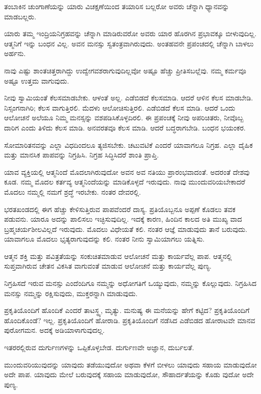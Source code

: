ತಂಬಾಕಿನ ಚುಂಗಾಣೆಯನ್ನು ಯಾರು ವಿಚಕ್ಷಣೆಯಿಂದ ತಯಾರಿಸ ಬಲ್ಲರೋ ಅವರು ಚೆನ್ನಾಗಿ ಧ್ಯಾನವನ್ನು ಮಾಡಬಲ್ಲರು.

ಯಾರು ತಮ್ಮ ಇಂದ್ರಿಯನಿಗ್ರಹವನ್ನು ಚೆನ್ನಾಗಿ ಮಾಡಿರುವರೋ ಅವರು ಯಾರ ಹೊರಗಿನ ಪ್ರಭಾವಕ್ಕೂ ಬೀಳುವುದಿಲ್ಲ. ಆತ್ಮನಿಗೆ ಇನ್ನು ಬಂಧನ ವಿಲ್ಲ. ಅವನ ಮನಸ್ಸು ಸ್ವತಂತ್ರವಾಗಿರುವುದು. ಅಂತಹವನೇ ಪ್ರಪಂಚದಲ್ಲಿ ಚೆನ್ನಾಗಿ ಬಾಳಲು ಅರ್ಹನು.

ನಾವು ಎಷ್ಟು ಶಾಂತಚಿತ್ತರಾಗಿದ್ದು ಉದ್ವೇಗವಶರಾಗುವುದಿಲ್ಲವೋ ಅಷ್ಟೂ ಹೆಚ್ಚು ಪ್ರೀತಿಸಬಲ್ಲೆವು. ನಮ್ಮ ಕರ್ಮವೂ ಅಷ್ಟೂ ಉತ್ತಮ ವಾಗುವುದು.

ನೀವು ಸ್ವಾಮಿಯಂತೆ ಕೆಲಸಮಾಡಬೇಕು. ಆಳಂತೆ ಅಲ್ಲ. ಎಡೆಬಿಡದೆ ಕೆಲಸಮಾಡಿ. ಆದರೆ ಆಳಿನ ಕೆಲಸ ಮಾಡಬೇಡಿ. ನಿಸ್ಸಂಗನಾಗಿರಿ; ಕೆಲಸ ವಾಗುತ್ತಿರಲಿ. ಮೆದಳು ಆಲೋಚಿಸುತ್ತಿರಲಿ. ಎಡೆಬಿಡದೆ ಕೆಲಸ ಮಾಡಿ. ಆದರೆ ಒಂದು ಆಲೋಚನೆ ಅಲೆಯೂ ನಿಮ್ಮ ಮನಸ್ಸನ್ನು ವಶಪಡಿಸಿಕೊಳ್ಳದಿರಲಿ. ಈ ಪ್ರಪಂಚಕ್ಕೆ ನೀವು ಅಪರಿಚಿತರು, ನೀವೊಬ್ಬ ದಾರಿಗ ಎಂದು ತಿಳಿದು ಕೆಲಸ ಮಾಡಿ. ಅನವರತವೂ ಕೆಲಸ ಮಾಡಿ. ಆದರೆ ಬದ್ಧರಾಗಬೇಡಿ. ಬಂಧನ ಭಯಂಕರ.

ಸೋಮಾರಿತನವನ್ನು ಎಲ್ಲಾ ವಿಧದಿಂದಲೂ ತ್ಯಜಿಸಬೇಕು. ಚಟುವಟಿಕೆ ಎಂದರೆ ಯಾವಾಗಲೂ ನಿಗ್ರಹ. ಎಲ್ಲಾ ದೈಹಿಕ ಮತ್ತು ಮಾನಸಿಕ ಪಾಪವನ್ನು ನಿಗ್ರಹಿಸಿ. ನಿಗ್ರಹ ಸಿದ್ಧಿಸಿದರೆ ಶಾಂತಿ ಪ್ರಾಪ್ತಿ.

ಯಾವ ವ್ಯಕ್ತಿಯಲ್ಲಿ ಆತ್ಮನಿಂದೆ ಮೊದಲಾಗಿರುವುದೋ ಅವನ ಅವ ನತಿಯು ಪ್ರಾರಂಭವಾದಂತೆ. ಅದರಂತೆ ದೇಶವು ಕೂಡ. ನಮ್ಮ ಮೊದಲ ಕರ್ತವ್ಯ ಆತ್ಮನಿಂದೆಯನ್ನು ಮಾಡಿಕೊಳ್ಳದೆ ಇರುವುದು. ನಾವು ಮುಂದುವರಿಯಬೇಕಾದರೆ ಮೊದಲು ನಮ್ಮಲ್ಲಿ ನಮಗೆ ಶ್ರದ್ಧೆ ಇರಬೇಕು. ನಂತರ ದೇವರಲ್ಲಿ.

ಭರತಖಂಡದಲ್ಲಿ ಈಗ ಹೆಚ್ಚು ಕೇಳಿಸುತ್ತಿರುವ ಪಾಪವೆಂದರೆ ದಾಸ್ಯ. ಪ್ರತಿಯೊಬ್ಬನೂ ಅಪ್ಪಣೆ ಕೊಡಲು ತವಕ ಪಡುವನು. ಯಾರೂ ಅದನ್ನು ಪಾಲಿಸಲು ಇಚ್ಛಿಸುವುದಿಲ್ಲ. ಇದಕ್ಕೆ ಕಾರಣ, ಹಿಂದಿನ ಕಾಲದ ಅತಿ ಮುಖ್ಯ ವಾದ ಬ್ರಹ್ಮಚರ್ಯಶೀಲವಿಲ್ಲದೆ ಇರುವುದು. ಮೊದಲು ವಿಧೇಯತೆ ಕಲಿ. ನಂತರ ಆಜ್ಞೆ ಮಾಡುವುದು ತಾನೆ ಬರುವುದು. ಯಾವಾಗಲೂ ಮೊದಲು ಭೃತ್ಯರಾಗುವುದನ್ನು ಕಲಿ. ನಂತರ ನೀನು ಸ್ವಾಮಿಯಾಗಲು ಯತ್ನಿಸು.

ಆತ್ಮನ ಶಕ್ತಿ ಮತ್ತು ಪವಿತ್ರತೆಯನ್ನು ಸಂಕುಚಿತಮಾಡುವ ಆಲೋಚನೆ ಮತ್ತು ಕಾರ್ಯವೆಲ್ಲ ಪಾಪ. ಆತ್ಮನಲ್ಲಿ ಸುಪ್ತವಾಗಿರುವ ಚೇತನ ವಿಕಸಿತ ವಾಗುವಂತೆ ಮಾಡುವ ಆಲೋಚನೆ ಮತ್ತು ಕಾರ್ಯವೆಲ್ಲ ಪುಣ್ಯ.

ನಿಗ್ರಹಿಸದೆ ಇರುವ ಮನಸ್ಸು ಎಂದೆಂದಿಗೂ ನಮ್ಮನ್ನು ಅಧೋಗತಿಗೆ ಒಯ್ಯುವುದು, ನಮ್ಮನ್ನು ಕೊಲ್ಲುವುದು. ನಿಗ್ರಹಿಸಿದ ಮನಸ್ಸು ನಮ್ಮನ್ನು ರಕ್ಷಿಸುವುದು, ಮುಕ್ತರನ್ನಾಗಿ ಮಾಡುವುದು.

ಪ್ರಕೃತಿಯೊಂದಿಗೆ ಹೊಂದಿಕೆ ಎಂದರೆ ತಾಟಸ್ಥ್ಯ, ಮೃತ್ಯು. ಮನುಷ್ಯ ಈ ಮನೆಯನ್ನು ಹೇಗೆ ಕಟ್ಟಿದ? ಪ್ರಕೃತಿಯೊಂದಿಗೆ ಹೊಂದಿಕೊಂಡೆ? ಇಲ್ಲ. ಪ್ರಕೃತಿಯೊಂದಿಗೆ ಹೋರಾಡಿ. ಪ್ರಕೃತಿಯೊಂದಿಗೆ ನಡೆಸಿದ ಎಡೆಬಿಡದ ಹೋರಾಟವೇ ಮಾನವ ಪುರೋಗಮನ. ಅದಕ್ಕೆ ಅಡಿಯಾಳಾಗುವುದಲ್ಲ.

ಇತರರಲ್ಲಿರುವ ದುರ್ಗುಣಗಳನ್ನು ಒಪ್ಪಿಕೊಳ್ಳಬೇಡ. ದುರ್ಗುಣವೇ ಅಜ್ಞಾನ, ದುರ್ಬಲತೆ.

ಮುಂದುವರಿಯುವುದನ್ನು ಯಾವುದು ತಡೆಯುವುದೋ ಅಥವಾ ಕೆಳಗೆ ಬೀಳಲು ಯಾವುದು ಸಹಾಯ ಮಾಡುವುದೋ ಅದೇ ಪಾಪ. ಯಾವುದು ಮೇಲೆ ಬರುವುದಕ್ಕೆ ಸಹಾಯ ಮಾಡುವುದೋ, ಸೌಹಾರ್ದತೆಯನ್ನು ಕೊಡು ವುದೋ ಅದೇ ಪುಣ್ಯ.

